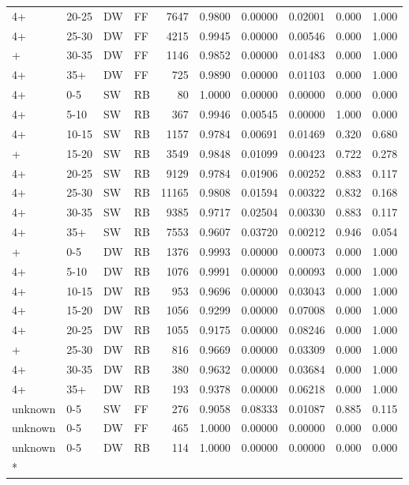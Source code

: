 \documentclass[
  11pt,
]{article}
\begin{document}
\begin{longtable}{llllrrrrrr}
4+ & 20-25 & DW & FF & 7647 & 0.9800 & 0.00000 & 0.02001 & 0.000 & 1.000\\
4+ & 25-30 & DW & FF & 4215 & 0.9945 & 0.00000 & 0.00546 & 0.000 & 1.000\\
\addlinespace
4+ & 30-35 & DW & FF & 1146 & 0.9852 & 0.00000 & 0.01483 & 0.000 & 1.000\\
4+ & 35+ & DW & FF & 725 & 0.9890 & 0.00000 & 0.01103 & 0.000 & 1.000\\
4+ & 0-5 & SW & RB & 80 & 1.0000 & 0.00000 & 0.00000 & 0.000 & 0.000\\
4+ & 5-10 & SW & RB & 367 & 0.9946 & 0.00545 & 0.00000 & 1.000 & 0.000\\
4+ & 10-15 & SW & RB & 1157 & 0.9784 & 0.00691 & 0.01469 & 0.320 & 0.680\\
\addlinespace
4+ & 15-20 & SW & RB & 3549 & 0.9848 & 0.01099 & 0.00423 & 0.722 & 0.278\\
4+ & 20-25 & SW & RB & 9129 & 0.9784 & 0.01906 & 0.00252 & 0.883 & 0.117\\
4+ & 25-30 & SW & RB & 11165 & 0.9808 & 0.01594 & 0.00322 & 0.832 & 0.168\\
4+ & 30-35 & SW & RB & 9385 & 0.9717 & 0.02504 & 0.00330 & 0.883 & 0.117\\
4+ & 35+ & SW & RB & 7553 & 0.9607 & 0.03720 & 0.00212 & 0.946 & 0.054\\
\addlinespace
4+ & 0-5 & DW & RB & 1376 & 0.9993 & 0.00000 & 0.00073 & 0.000 & 1.000\\
4+ & 5-10 & DW & RB & 1076 & 0.9991 & 0.00000 & 0.00093 & 0.000 & 1.000\\
4+ & 10-15 & DW & RB & 953 & 0.9696 & 0.00000 & 0.03043 & 0.000 & 1.000\\
4+ & 15-20 & DW & RB & 1056 & 0.9299 & 0.00000 & 0.07008 & 0.000 & 1.000\\
4+ & 20-25 & DW & RB & 1055 & 0.9175 & 0.00000 & 0.08246 & 0.000 & 1.000\\
\addlinespace
4+ & 25-30 & DW & RB & 816 & 0.9669 & 0.00000 & 0.03309 & 0.000 & 1.000\\
4+ & 30-35 & DW & RB & 380 & 0.9632 & 0.00000 & 0.03684 & 0.000 & 1.000\\
4+ & 35+ & DW & RB & 193 & 0.9378 & 0.00000 & 0.06218 & 0.000 & 1.000\\
unknown & 0-5 & SW & FF & 276 & 0.9058 & 0.08333 & 0.01087 & 0.885 & 0.115\\
unknown & 0-5 & DW & FF & 465 & 1.0000 & 0.00000 & 0.00000 & 0.000 & 0.000\\
\addlinespace
unknown & 0-5 & DW & RB & 114 & 1.0000 & 0.00000 & 0.00000 & 0.000 & 0.000\\*

\end{longtable}
\end{document}
